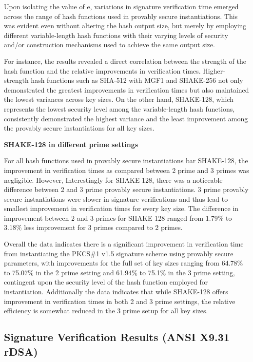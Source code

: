 \documentclass[]{final_report}
\theoremstyle{definition}
\begin{document}
Upon isolating the value of e, variations in signature verification time emerged across the range of hash functions used in provably secure instantiations. This was evident even without altering the hash output size, but merely by employing different variable-length hash functions with their varying levels of security and/or construction mechanisms used to achieve the same output size.

For instance, the results revealed a direct correlation between the strength of the hash function and the relative improvements in verification times. Higher-strength hash functions such as SHA-512 with MGF1 and SHAKE-256 not only demonstrated the greatest improvements in verification times but also maintained the lowest variances across key sizes. On the other hand, SHAKE-128, which represents the lowest security level among the variable-length hash functions, consistently demonstrated the highest variance and the least improvement among the provably secure instantiations for all key sizes.

\textbf{SHAKE-128 in different prime settings}

For all hash functions used in provably secure instantiations bar SHAKE-128, the improvement in verification times as compared between 2 prime and 3 primes was negligible. However, Interestingly for SHAKE-128, there was a noticeable difference between 2 and 3 prime provably secure instantiations. 3 prime provably secure instantiations were slower in signature verifications and thus lead to smallest improvement in verification times for every key size. The difference in improvement between 2 and 3 primes for SHAKE-128 ranged from 1.79\% to 3.18\%  less improvement for 3 primes compared to 2 primes.


Overall the data indicates there is a significant improvement in verification time from instantiating the PKCS\#1 v1.5 signature scheme using provably secure parameters, with improvements for the full set of key sizes ranging from 64.78\% to 75.07\% in the 2 prime setting and 61.94\% to 75.1\% in the 3 prime setting, contingent upon the security level of the hash function employed for instantiation. Additionally the data indicates that while SHAKE-128 offers improvement in verification times in both 2 and 3 prime settings, the relative efficiency is somewhat reduced in the 3 prime setup for all key sizes.

\newpage

\subsection{Signature Verification Results (ANSI X9.31 rDSA)}
\end{document}
